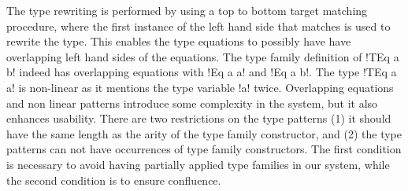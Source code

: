 \documentclass[format=sigplan,manuscript,review,screen,nonacm,margin=1in]{acmart}
\begin{document}
The type rewriting is performed by using a top to bottom target matching procedure,
where the first instance of the left hand side that matches is used to rewrite the type.
This enables the type equations to possibly have have overlapping left hand sides of the equations.  
The type family definition of !TEq a b! indeed has overlapping equations with !Eq a a! and !Eq a b!.
The type !TEq a a! is non-linear as it mentions the type variable !a! twice.
Overlapping equations and non linear patterns introduce some complexity in the system, but it also
enhances usability. There are two restrictions on the type patterns
(1) it should  have the same length as the arity of the type family constructor, and
(2) the type patterns can not have occurrences of type family constructors.
The first condition is necessary to avoid having partially applied type families in our system,
while the second condition is to ensure confluence.
\end{document}
